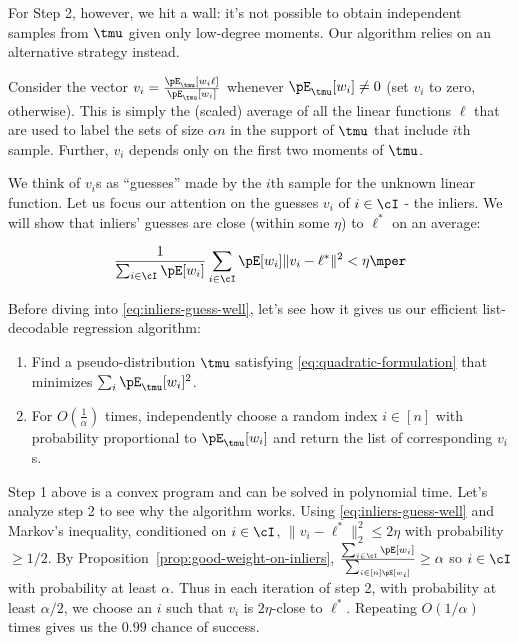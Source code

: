For Step 2, however, we hit a wall: it's not possible to obtain independent samples from $\tmu$ given only low-degree moments. Our algorithm relies on an alternative strategy instead. 

Consider the vector $v_i = \frac{\pE_{\tmu}[w_i \ell]}{\pE_{\tmu}[w_i]}$ whenever $\pE_{\tmu}[w_i] \neq 0$ (set $v_i$ to zero, otherwise).  This is simply the (scaled) average of all the linear functions $\ell$ that are used to label the sets of size $\alpha n$ in the support of $\tmu$ that include $i$th sample. Further, $v_i$ depends only on the first two moments of $\tmu$.

We think of $v_i$s as ``guesses'' made by the $i$th sample for the unknown linear function. 
Let us focus our attention on the guesses $v_i$ of $i \in \cI$ - the inliers.
We will show that inliers' guesses are close (within some $\eta$) to $\ell^*$ on an average:


\begin{equation}
\frac{1}{\sum_{i \in \cI} \pE[w_i]} \sum_{i \in \cI} \pE[w_i] \| v_i - \ell^*\|^2  < \eta \mper \label{eq:inliers-guess-well}
\end{equation}

Before diving into \eqref{eq:inliers-guess-well}, let's see how it gives us our efficient list-decodable regression algorithm:

\begin{enumerate}
	\item Find a pseudo-distribution $\tmu$ satisfying \eqref{eq:quadratic-formulation} that minimizes $\sum_i \pE_{\tmu}[w_i]^2$.
	\item For $O(\frac{1}{\alpha})$ times, independently choose a random index $i \in [n]$ with probability proportional to $\pE_{\tmu}[w_i]$ and return the list of corresponding $v_i$s. 
\end{enumerate} 

Step 1 above is a convex program and can be solved in polynomial time. Let's analyze step 2 to see why the algorithm works. Using \eqref{eq:inliers-guess-well} and Markov's inequality, conditioned on $i \in \cI$, $\|v_i - \ell^*\|_2^2 \leq 2 \eta$ with probability $\geq 1/2$. By Proposition~\ref{prop:good-weight-on-inliers}, $\frac{\sum_{i \in \cI} \pE[w_i]}{\sum_{i \in [n] \pE[w_i]}} \geq \alpha$ so $i \in \cI$ with probability at least $\alpha$. Thus in each iteration of step 2, with probability at least $\alpha/2$, we choose an $i$ such that $v_i$ is $2\eta$-close to $\ell^*$. Repeating $O(1/\alpha)$ times gives us the $0.99$ chance of success.

